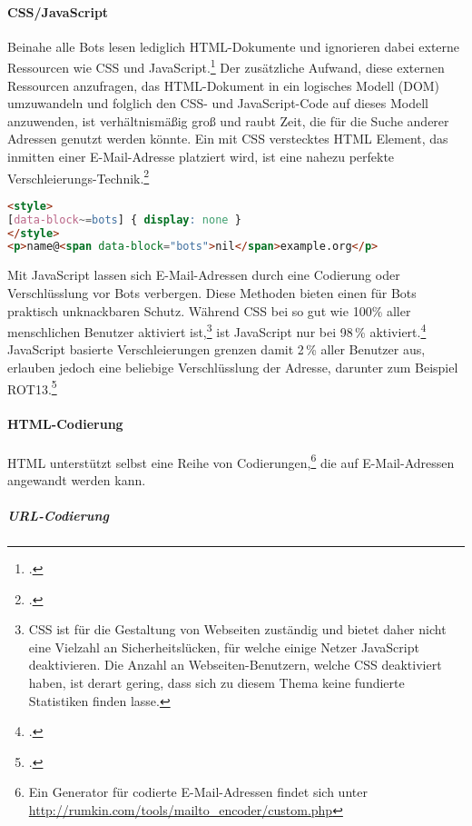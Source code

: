 \paragraph{CSS/JavaScript}
\label{par:cssjavascipt}

Beinahe alle Bots lesen lediglich HTML-Dokumente und ignorieren dabei externe
Ressourcen wie CSS und JavaScript.\footcite{hideEmailAddress} Der zusätzliche
Aufwand, diese externen Ressourcen anzufragen, das HTML-Dokument in ein
logisches Modell (DOM) umzuwandeln und folglich den CSS- und JavaScript-Code
auf dieses Modell anzuwenden, ist verhältnismäßig groß und raubt Zeit, die für
die Suche anderer Adressen genutzt werden könnte. Ein mit CSS verstecktes HTML
Element, das inmitten einer E-Mail-Adresse platziert wird, ist eine nahezu
perfekte Verschleierungs-Technik.\footcite{obfuscateEmailAddresses}

\begin{lstlisting}[language=HTML]
<style>
[data-block~=bots] { display: none }
</style>
<p>name@<span data-block="bots">nil</span>example.org</p>
\end{lstlisting}

Mit JavaScript lassen sich E-Mail-Adressen durch eine Codierung oder
Verschlüsslung vor Bots verbergen. Diese Methoden bieten einen für Bots
praktisch unknackbaren Schutz. Während CSS bei so gut wie 100\% aller
menschlichen Benutzer aktiviert ist,\footnote{CSS ist für die Gestaltung von
Webseiten zuständig und bietet daher nicht eine Vielzahl an Sicherheitslücken,
für welche einige Netzer JavaScript deaktivieren. Die Anzahl an
Webseiten-Benutzern, welche CSS deaktiviert haben, ist derart gering, dass sich
zu diesem Thema keine fundierte Statistiken finden lasse.} ist JavaScript nur
bei 98\,\% aktiviert.\footcite{javaScriptDisableStats} JavaScript basierte
Verschleierungen grenzen damit 2\,\% aller Benutzer aus, erlauben jedoch eine
beliebige Verschlüsslung der Adresse, darunter zum Beispiel
ROT13.\footcite{modernCryptanalysis}

\paragraph{HTML-Codierung}
\label{par:html-codierung}

HTML unterstützt selbst eine Reihe von Codierungen,\footnote{Ein Generator für
codierte E-Mail-Adressen findet sich unter
\url{http://rumkin.com/tools/mailto_encoder/custom.php}} die auf
E-Mail-Adressen angewandt werden kann.

\subparagraph{URL-Codierung}
\label{spar:url-codierung}

